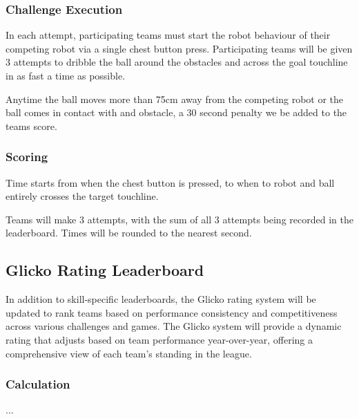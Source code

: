 \subsubsection{Challenge Execution}
In each attempt, participating teams must start the robot behaviour of their competing robot via a single chest button
press. Participating teams will be given 3 attempts to dribble the ball around the obstacles and across
the goal touchline in as fast a time as possible.

Anytime the ball moves more than 75cm away from the competing robot or the ball comes in contact with
and obstacle, a 30 second penalty we be added to the teams score.

\subsubsection{Scoring}
Time starts from when the chest button is pressed, to when to robot and ball entirely crosses the target touchline.

Teams will make 3 attempts, with the sum of all 3 attempts being recorded in the leaderboard.
Times will be rounded to the nearest second.

\subsection{Glicko Rating Leaderboard}
In addition to skill-specific leaderboards, the Glicko rating system will be updated to rank teams based on
performance consistency and competitiveness across various challenges and games.
The Glicko system will provide a dynamic rating that adjusts based on team performance
year-over-year, offering a comprehensive view of each team's standing in the league.

\subsubsection{Calculation}
...
